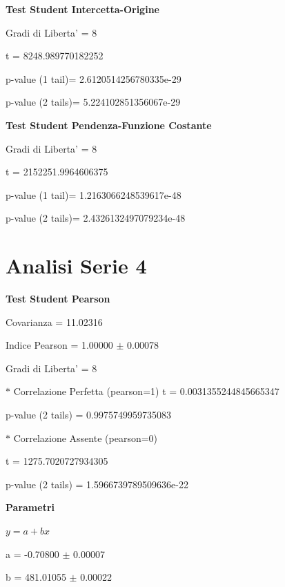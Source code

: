 \documentclass{article}
\begin{document}
\textbf{Test Student Intercetta-Origine}

Gradi di Liberta' = 8

t = 8248.989770182252

p-value (1 tail)= 2.6120514256780335e-29

p-value (2 tails)= 5.224102851356067e-29

\textbf{Test Student Pendenza-Funzione Costante}

Gradi di Liberta' = 8

t = 2152251.9964606375

p-value (1 tail)= 1.2163066248539617e-48

p-value (2 tails)= 2.4326132497079234e-48

\section*{Analisi Serie 4}

\textbf{Test Student Pearson}

Covarianza = 11.02316

Indice Pearson = 1.00000 $\pm$ 0.00078

Gradi di Liberta' = 8

$\ast$ Correlazione Perfetta (pearson=1)
t = 0.0031355244845665347

p-value (2 tails) = 0.9975749959735083

$\ast$ Correlazione Assente (pearson=0)

t = 1275.7020727934305

p-value (2 tails) = 1.5966739789509636e-22

\textbf{Parametri}

$y = a + bx$

a = -0.70800 $\pm$ 0.00007

b = 481.01055 $\pm$ 0.00022
\end{document}
